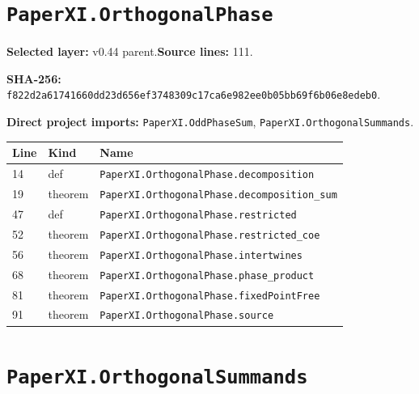 \documentclass[10pt,oneside]{book}
\begin{document}
\section{\texorpdfstring{\nolinkurl{PaperXI.OrthogonalPhase}}{PaperXI.OrthogonalPhase}}\label{module:PaperXI.OrthogonalPhase}

\textbf{Selected layer:} v0.44 parent.\quad\textbf{Source lines:} 111.\par\textbf{SHA-256:} {\scriptsize\nolinkurl{f822d2a61741660dd23d656ef3748309c17ca6e982ee0b05bb69f6b06e8edeb0}}.


\textbf{Direct project imports:} \nolinkurl{PaperXI.OddPhaseSum}, \nolinkurl{PaperXI.OrthogonalSummands}.

\begin{longtable}{@{}p{}p{}p{}@{}}\toprule Line&Kind&Name\\\midrule\endhead

14&def&\nolinkurl{PaperXI.OrthogonalPhase.decomposition}\\

19&theorem&\nolinkurl{PaperXI.OrthogonalPhase.decomposition_sum}\\

47&def&\nolinkurl{PaperXI.OrthogonalPhase.restricted}\\

52&theorem&\nolinkurl{PaperXI.OrthogonalPhase.restricted_coe}\\

56&theorem&\nolinkurl{PaperXI.OrthogonalPhase.intertwines}\\

68&theorem&\nolinkurl{PaperXI.OrthogonalPhase.phase_product}\\

81&theorem&\nolinkurl{PaperXI.OrthogonalPhase.fixedPointFree}\\

91&theorem&\nolinkurl{PaperXI.OrthogonalPhase.source}\\

\bottomrule\end{longtable}

\section{\texorpdfstring{\nolinkurl{PaperXI.OrthogonalSummands}}{PaperXI.OrthogonalSummands}}\label{module:PaperXI.OrthogonalSummands}
\end{document}
